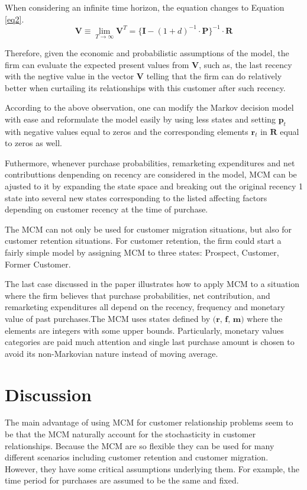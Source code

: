 \documentclass[11pt]{article}
\begin{document}
When considering an infinite time horizon, the equation changes to Equation \ref{eq2}.
\begin{equation}\label{eq2}
\textbf{V} \equiv \lim_{T \rightarrow \infty} \textbf{V}^T = \{\textbf{I} - (1 + d)^{-1} \cdot \textbf{P} \}^{-1} \cdot \textbf{R}
\end{equation}


Therefore, given the economic and probabilistic assumptions of the model, the firm can evaluate the expected present values from $\textbf{V}$, such as, the last recency with the negtive value in the vector $\textbf{V}$ telling that the firm can do relatively better when curtailing its relationships with this customer after such recency.

According to the above observation, one can modify the Markov decision model with ease and reformulate the model easily by using less states and setting $\textbf{p}_t$ with negative values equal to zeros and the corresponding elements $\textbf{r}_t$ in $\textbf{R}$ equal to zeros as well.

Futhermore, whenever purchase probabilities, remarketing expenditures and net contributtions denpending on recency are considered in the model, MCM can be ajusted to it by expanding the state space and breaking out the original recency 1 state into several new states corresponding to the listed affecting factors depending on customer recency at the time of purchase. 

The MCM can not only be used for customer migration situations, but also for customer retention situations. For customer retention, the firm could start a fairly simple model by assigning MCM to three states:  Prospect, Customer, Former Customer. 

The last case discussed in the paper illustrates how to apply MCM to a situation where the firm believes that purchase probabilities, net contribution, and remarketing expenditures all depend on the recency, frequency and monetary value of past purchases.The MCM uses states defined by $\textbf{(r, f, m)}$ where the elements are integers with some upper bounds. Particularly, monetary values categories are paid much attention and single last purchase amount is chosen to avoid its non-Markovian nature instead of moving average.




\section{Discussion}
The main advantage of using MCM for customer relationship problems seem to be that the MCM naturally account for the stochasticity in customer relationships.
Because the MCM are so flexible they can be used for many different scenarios including customer retention and customer migration.
However, they have some critical assumptions underlying them. 
For example, the time period for purchases are assumed to be the same and fixed.

\end{document}
